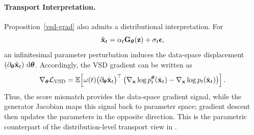 \paragraph{Transport Interpretation.}
Proposition~\ref{vsd-grad} also admits a distributional interpretation.
For
\[
\hat{{\mathbf{x}}}_t
=
\alpha_t{\mathbf{G}}_{\bm{\theta}}({\mathbf{z}})+\sigma_t{\bm{\epsilon}},
\]
an infinitesimal parameter perturbation induces the data-space displacement
$(\partial_{\bm{\theta}}\hat{{\mathbf{x}}}_t)\,\mathop{}\!\mathrm{d}{\bm{\theta}}$. Accordingly, the VSD gradient
can be written as
\[
\nabla_{{\bm{\theta}}}\mathcal{L}_{\mathrm{VSD}}
=
\mathbb{E}\!\left[
\omega(t)
\big(\partial_{\bm{\theta}}\hat{{\mathbf{x}}}_t\big)^\top
\left(
\nabla_{{\mathbf{x}}}\log p_t^{{\bm{\theta}}}(\hat{{\mathbf{x}}}_t)
-
\nabla_{{\mathbf{x}}}\log p_t(\hat{{\mathbf{x}}}_t)
\right)
\right].
\]
Thus, the score mismatch provides the data-space gradient signal, while the
generator Jacobian maps this signal back to parameter space; gradient descent
then updates the parameters in the opposite direction. This is the parametric counterpart of the
distribution-level transport view in
.







